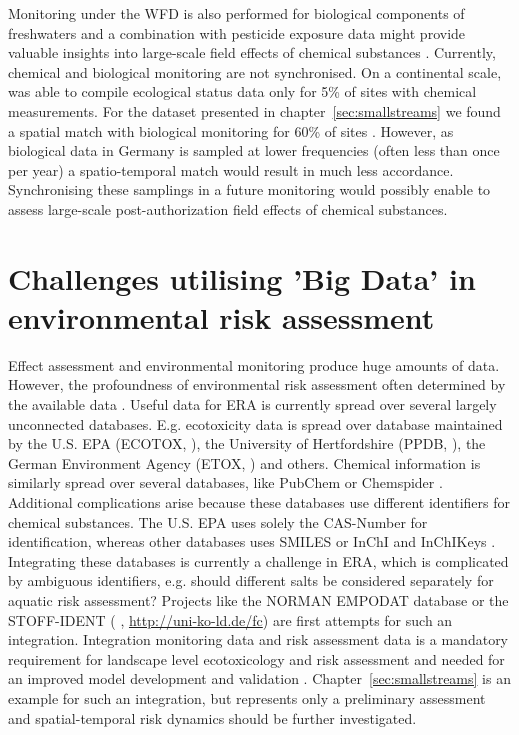 Monitoring under the WFD is also performed for biological components of freshwaters and a combination with pesticide exposure data might provide valuable insights into large-scale field effects of chemical substances \citep{schipper_deriving_2014}.
Currently, chemical and biological monitoring are not synchronised.
On a continental scale, \citet{malaj_organic_2014} was able to compile ecological status data only for 5\% of sites with chemical measurements.
For the dataset presented in chapter~\ref{sec:smallstreams} we found a spatial match with biological monitoring for 60\% of sites \citep{brinke_umsetzung_2016}.
However, as biological data in Germany is sampled at lower frequencies (often less than once per year) a spatio-temporal match would result in much less accordance. 
Synchronising these samplings in a future monitoring would possibly enable to assess large-scale post-authorization field effects of chemical substances.



\section{Challenges utilising 'Big Data' in environmental risk assessment}

Effect assessment and environmental monitoring produce huge amounts of data. 
However, the profoundness of environmental risk assessment often determined by the available data \citep{van_den_brink_new_2016}.
Useful data for ERA is currently spread over several largely unconnected databases. 
E.g. ecotoxicity data is spread over database maintained by the U.S. EPA (ECOTOX, \citet{u.s._epa_ecotox_2016}), the University of Hertfordshire (PPDB, \citet{lewis_international_2016}), the German Environment Agency (ETOX, \citet{umweltbundesamt_etox:_2016}) and others. 
Chemical information is similarly spread over several databases, like PubChem \citep{kim_pubchem_2016} or Chemspider \citep{pence_chemspider:_2010}.
Additional complications arise because these databases use different identifiers for chemical substances. 
The U.S. EPA \citep{u.s._epa_ecotox_2016} uses solely the CAS-Number for identification, whereas other databases uses SMILES \citep{weininger_smiles._1990} or InChI and InChIKeys \citep{heller_inchi_2015}. 
Integrating these databases is currently a challenge in ERA, which is complicated by ambiguous identifiers, e.g. should different salts be considered separately for aquatic risk assessment?
Projects like the NORMAN EMPODAT database \citep{brack_norman_2012} or the STOFF-IDENT (\citeauthor{huckele_risk_2013} \cite*{huckele_risk_2013}, \url{http://uni-ko-ld.de/fc}) are first attempts for such an integration.
Integration monitoring data and risk assessment data is a mandatory requirement for landscape level ecotoxicology and risk assessment \citep{focks_challenge:_2014} and needed for an improved model development and validation \citep{knabel_regulatory_2012, brock_aquatic_2006}. 
Chapter~\ref{sec:smallstreams} is an example for such an integration, but represents only a preliminary assessment and spatial-temporal risk dynamics should be further investigated. 

